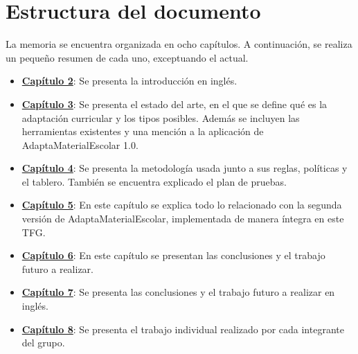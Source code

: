 \section{Estructura del documento}\label{cap:estructura}
La memoria se encuentra organizada en ocho capítulos. A continuación, se realiza un pequeño resumen de cada uno, exceptuando el actual.
\begin{itemize}
    \item \textbf{\hyperref[cap:introduction]{Capítulo 2}}: Se presenta la introducción en inglés.
    \item \textbf{\hyperref[cap:estadoDelArte]{Capítulo 3}}: Se presenta el estado del arte, en el que se define qué es la adaptación curricular y los tipos posibles. Además se incluyen las herramientas existentes y una mención a la aplicación de AdaptaMaterialEscolar 1.0.
    \item \textbf{\hyperref[cap:metodologia]{Capítulo 4}}: Se presenta la metodología usada junto a sus reglas, políticas y el tablero. También se encuentra explicado el plan de pruebas.
    \item \textbf{\hyperref[cap:AdaptaMaterialEscolar2.0]{Capítulo 5}}: En este capítulo se explica todo lo relacionado con la segunda versión de AdaptaMaterialEscolar, implementada de manera íntegra en este TFG.
    \item \textbf{\hyperref[cap:conclusiones]{Capítulo 6}}: En este capítulo se presentan las conclusiones y el trabajo futuro a realizar.
    \item \textbf{\hyperref[cap:conclusions]{Capítulo 7}}: Se presenta las conclusiones y el trabajo futuro a realizar en inglés.
    \item \textbf{\hyperref[cap:TrabajoIndividual]{Capítulo 8}}: Se presenta el trabajo individual realizado por cada integrante del grupo.
\end{itemize}